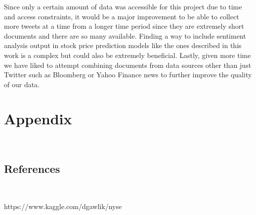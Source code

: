 \documentclass[11pt, oneside]{article}   	%
\begin{document}
 Since only a certain amount of data was accessible for this project due to time and access constraints, it would be a major improvement to be able to collect more tweets at a time from a longer time period since they are extremely short documents and there are so many available. Finding a way to include sentiment analysis output in stock price prediction models like the ones described in this work is a complex but could also be extremely beneficial. Lastly, given more time we have liked to attempt combining documents from data sources other than just Twitter such as Bloomberg or Yahoo Finance news to further improve the quality of our data.

   
 \newpage  

\section{Appendix}\

\subsection{References}\

https://www.kaggle.com/dgawlik/nyse \\
\end{document}
